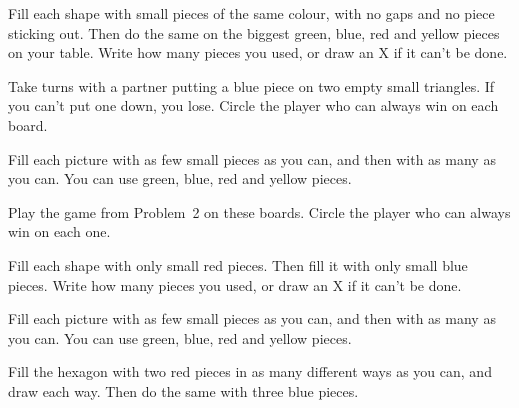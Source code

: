 \documentclass[12pt]{article}
\begin{document}
\large

\problem Fill each shape with small pieces of the same colour, with no gaps and no piece sticking out. Then do the same on the biggest green, blue, red and yellow pieces on your table. Write how many pieces you used, or draw an X if it can't be done.

\newpage
\problem Take turns with a partner putting a blue piece on two empty small triangles. If you can't put one down, you lose. Circle the player who can always win on each board.

\newpage
\problem Fill each picture with as few small pieces as you can, and then with as many as you can. You can use green, blue, red and yellow pieces.

\newpage
\problem Play the game from Problem~2 on these boards. Circle the player who can always win on each one.

\newpage
\problem Fill each shape with only small red pieces. Then fill it with only small blue pieces. Write how many pieces you used, or draw an X if it can't be done.

\newpage
\problem Fill each picture with as few small pieces as you can, and then with as many as you can. You can use green, blue, red and yellow pieces.

\newpage
\problem Fill the hexagon with two red pieces in as many different ways as you can, and draw each way. Then do the same with three blue pieces.
\end{document}
